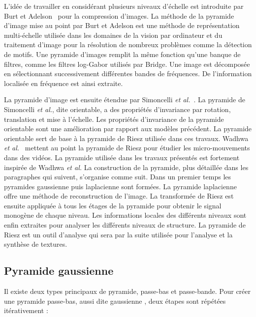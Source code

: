 L'idée de travailler en considérant plusieurs niveaux d'échelle est introduite par Burt et Adelson~\cite{burt_laplacian_1983} pour la compression d'images. La méthode de la pyramide d'image mise au point par Burt et Adelson est une méthode de représentation multi-échelle utilisée dans les domaines de la vision par ordinateur et du traitement d'image pour la résolution de nombreux problèmes comme la détection de motifs. Une pyramide d'images remplit la même fonction qu'une banque de filtres, comme les filtres log-Gabor utilisés par Bridge. Une image est décomposée en sélectionnant successivement différentes bandes de fréquences. De l'information localisée en fréquence est ainsi extraite.

\bigskip

La pyramide d'image est ensuite étendue par Simoncelli \textit{et al.}~\cite{simoncelli_shiftable_1992}. La pyramide de Simoncelli \textit{et al.}, dite orientable, a des propriétés d'invariance par rotation, translation et mise à l'échelle. Les propriétés d'invariance de la pyramide orientable sont une amélioration par rapport aux modèles précédent. La pyramide orientable sert de base à la pyramide de Riesz utilisée dans ces travaux. Wadhwa \textit{et al.}~\cite{wadhwa_phase_based_2013} mettent au point la pyramide de Riesz pour étudier les micro-mouvements dans des vidéos. La pyramide utilisée dans les travaux présentés est fortement inspirée de Wadhwa \textit{et al.} La construction de la pyramide, plus détaillée dans les paragraphes qui suivent, s'organise comme suit. Dans un premier temps les pyramides gaussienne puis laplacienne sont formées. La pyramide laplacienne offre une méthode de reconstruction de l'image. La transformée de Riesz est ensuite appliquée à tous les étages de la pyramide pour obtenir le signal monogène de chaque niveau. Les informations locales des différents niveaux sont enfin extraites pour analyser les différents niveaux de structure. La pyramide de Riesz est un outil d'analyse qui sera par la suite utilisée pour l'analyse et la synthèse de textures.

\subsection{Pyramide gaussienne}

Il existe deux types principaux de pyramide, passe-bas et passe-bande. Pour créer une pyramide passe-bas, aussi dite \og gaussienne \fg, deux étapes sont répétées itérativement :

\bigskip

